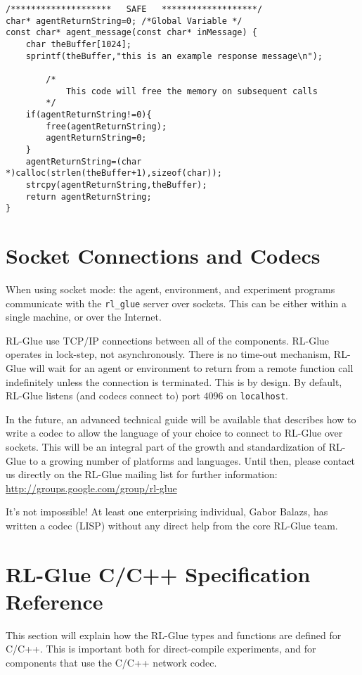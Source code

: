 \documentclass[11pt]{article}
\begin{document}
\begin{verbatim}
/********************   SAFE   *******************/
char* agentReturnString=0; /*Global Variable */	
const char* agent_message(const char* inMessage) {
    char theBuffer[1024];
    sprintf(theBuffer,"this is an example response message\n");

        /*
            This code will free the memory on subsequent calls
        */
    if(agentReturnString!=0){
        free(agentReturnString);
        agentReturnString=0;
    }
    agentReturnString=(char *)calloc(strlen(theBuffer+1),sizeof(char));
    strcpy(agentReturnString,theBuffer);
    return agentReturnString;
}
\end{verbatim}



\section{Socket Connections and Codecs}
When using socket mode: the agent, environment, and experiment programs communicate with the \texttt{rl\_glue} server over sockets.  This can be either within a single machine, or over the Internet.

RL-Glue use TCP/IP connections between all of the components.  RL-Glue operates in lock-step, not asynchronously.  There is no time-out mechanism, RL-Glue will wait for an agent or environment to return from a remote function call indefinitely unless the connection is terminated.  This is by design.   By default, RL-Glue listens (and codecs connect to) port $4096$ on \texttt{localhost}.

In the future, an advanced technical guide will be available that describes how to write a codec to allow the language of your choice to connect to RL-Glue over sockets.  This will be an integral part of the growth and standardization of RL-Glue to a growing number of platforms and languages.  Until then, please contact us directly on the RL-Glue mailing list for further information:\\
\url{http://groups.google.com/group/rl-glue}

It's not impossible!  At least one enterprising individual, Gabor Balazs, has written a codec (LISP) without any direct help from the core RL-Glue team.  

\section{RL-Glue C/C++ Specification Reference}
This section will explain how the RL-Glue types and functions are defined for C/C++.  This is important both for direct-compile experiments, and for components that
 use the C/C++ network codec.
\end{document}
